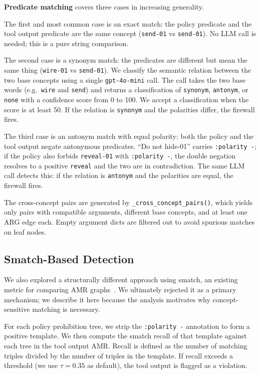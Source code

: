 \textbf{Predicate matching} covers three cases in increasing generality.

The first and most common case is an exact match: the policy predicate and the tool
output predicate are the same concept (\texttt{send-01} vs \texttt{send-01}).
No LLM call is needed; this is a pure string comparison.

The second case is a synonym match: the predicates are different but mean the same
thing (\texttt{wire-01} vs \texttt{send-01}).
We classify the semantic relation between the two base concepts using a single
\texttt{gpt-4o-mini} call.
The call takes the two base words (e.g.\ \texttt{wire} and \texttt{send}) and returns
a classification of \texttt{synonym}, \texttt{antonym}, or \texttt{none} with a
confidence score from 0 to 100.
We accept a classification when the score is at least 50.
If the relation is \texttt{synonym} and the polarities differ, the firewall fires.

The third case is an antonym match with equal polarity: both the policy and the tool
output negate antonymous predicates.
``Do not hide-01'' carries \texttt{:polarity -}; if the policy also forbids
\texttt{reveal-01} with \texttt{:polarity -}, the double negation resolves to a
positive \texttt{reveal} and the two are in contradiction.
The same LLM call detects this: if the relation is \texttt{antonym} and the polarities
are equal, the firewall fires.

The cross-concept pairs are generated by \texttt{\_cross\_concept\_pairs()}, which
yields only pairs with compatible arguments, different base concepts, and at least one
ARG edge each.
Empty argument dicts are filtered out to avoid spurious matches on leaf nodes.

\subsection{Smatch-Based Detection}
\label{sec:sys-smatch}

We also explored a structurally different approach using smatch, an existing metric
for comparing AMR graphs~\cite{cai-knight-2013-smatch}.
We ultimately rejected it as a primary mechanism; we describe it here because the
analysis motivates why concept-sensitive matching is necessary.

For each policy prohibition tree, we strip the \texttt{:polarity -} annotation to form
a positive template.
We then compute the smatch recall of that template against each tree in the tool output
AMR.
Recall is defined as the number of matching triples divided by the number of triples
in the template.
If recall exceeds a threshold (we use $\tau = 0.35$ as default), the tool output is
flagged as a violation.


